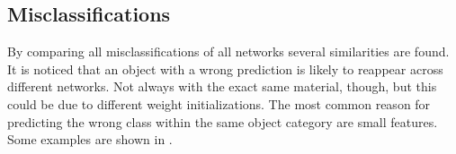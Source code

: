 \subsection{Misclassifications}
\label{sec:predictions-misclassifications}
%
%
%
%
By comparing all misclassifications of all networks several similarities are found.
It is noticed that an object with a wrong prediction is likely to reappear across different networks.
Not always with the exact same material, though, but this could be due to different weight initializations.
The most common reason for predicting the wrong class within the same object category are small features.
Some examples are shown in .
